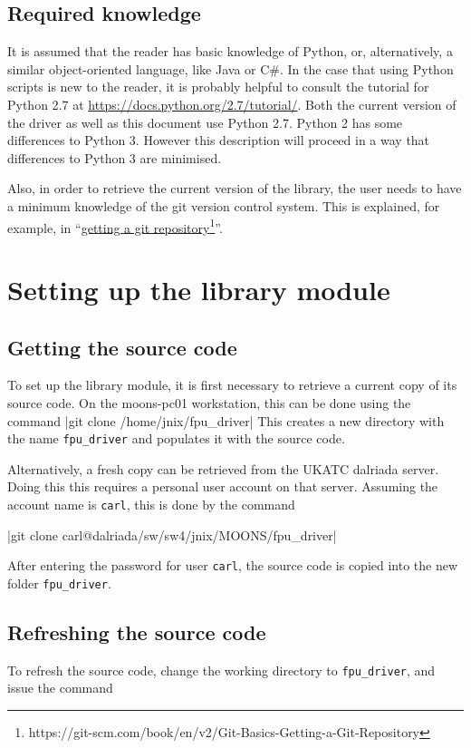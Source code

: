 \documentclass{scrartcl}[12pt,a4paper]
\begin{document}
\subsection{Required knowledge}

It is assumed that the reader has basic knowledge of Python, or,
alternatively, a similar object-oriented language, like Java or C\#.
In the case that using Python scripts is new to the reader, it is
probably helpful to consult the tutorial for Python 2.7 at
\url{https://docs.python.org/2.7/tutorial/}.  Both the current version
of the driver as well as this document use Python 2.7. Python 2 has
some differences to Python 3. However this description will proceed in
a way that differences to Python 3 are minimised.

Also, in order to retrieve the current version of the library, the
user needs to have a minimum knowledge of the git version control
system. This is explained, for example, in
``\href{https://git-scm.com/book/en/v2/Git-Basics-Getting-a-Git-Repository}{getting
  a git repository}\footnote{https://git-scm.com/book/en/v2/Git-Basics-Getting-a-Git-Repository}''.

\section{Setting up the library module}

\subsection{Getting the source code}

To set up the library module, it is first
necessary to retrieve a current copy of its source code.
On the moons-pc01 workstation, this can be done using the
command |git clone /home/jnix/fpu_driver|
This creates a new directory with the name \texttt{fpu\_driver}
and populates it with the source code.

Alternatively, a fresh copy can be retrieved from the UKATC dalriada
server. Doing this this requires a personal user account on that
server. Assuming the account name is \texttt{carl}, this is done by
the command

|git clone carl@dalriada/sw/sw4/jnix/MOONS/fpu_driver|

After entering the password for user \texttt{carl}, the
source code is copied into the new folder \texttt{fpu\_driver}.

\subsection{Refreshing the source code}
To refresh the source code, change the
working directory to \texttt{fpu\_driver},
and issue the command
\end{document}
